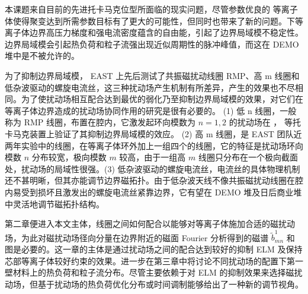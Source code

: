 \begin{cabstract}
  本课题来自目前的先进托卡马克位型所面临的现实问题，尽管参数优良的 \Hmode 等离子体使得聚变达到所需参数目标有了更大的可能性，但同时也带来了新的问题。\Hmode 下等离子体边界高压力梯度和强电流密度蕴含的自由能，引起了边界局域模不稳定性。边界局域模会引起热负荷和粒子流强出现近似周期性的脉冲峰值，而这在 DEMO 堆中是不被允许的。

  为了抑制边界局域模， EAST 上先后测试了共振磁扰动线圈 RMP、高 m 线圈和低杂波驱动的螺旋电流丝，这三种扰动场产生机制有所差异，产生的效果也不尽相同。为了使扰动场相互配合达到最优的弱化乃至抑制边界局域模的效果，对它们在等离子体边界造成的扰动场协同作用的研究是很有必要的。 (1) 低 n 线圈，一般称为 RMP 线圈，布置在腔内，它激发起环向模数为 $n=1,2$ 的扰动场在 \east， \ddd 等托卡马克装置上验证了其抑制边界局域模的效应。 (2) 高 m 线圈，是 EAST 团队近两年实验中的线圈，在等离子体环外加上一组四个的线圈，它的特征是扰动场环向模数 $n$ 分布较宽，极向模数 $m$ 较高，由于一组高 $m$ 线圈只分布在一个极向截面处，扰动场的局域性很强。(3) 低杂波驱动的螺旋电流丝，电流丝的具体物理机制还不甚明晰，但其亦能调节边界磁拓扑。由于低杂波天线不像共振磁扰动线圈在腔内易受到损坏且激发出的螺旋电流丝紧靠边界，它有望在 DEMO 堆及日后商业堆中灵活地调节磁拓扑结构。
  
  第二章便进入本文主体，线圈之间如何配合以能够对等离子体施加合适的磁扰动场，为此对磁扰动场径向分量在边界附近的磁面 Fourier 分析得到的磁谱 $\tilde{b}^1_{mn}$ 和 \Poincare 图是必要的。这一章的主体是通过扰动场之间的配合达到较好的抑制 ELM 及保持芯部等离子体较好约束的效果。进一步在第三章中将讨论不同扰动场的配置下第一壁材料上的热负荷和粒子流分布。尽管主要依赖于对 ELM 的抑制效果来选择磁扰动场，但基于扰动场的热负荷优化分布或时间调制能够给出了一种新的调节视角。%

\end{cabstract}


